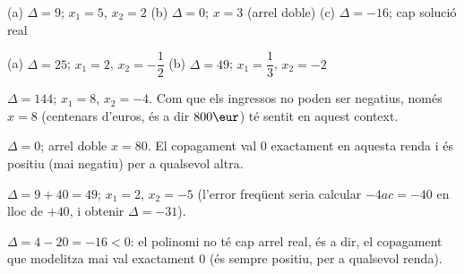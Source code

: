 \begin{solucions}
\begin{sollist}
  \item (a) $\Delta=9$; $x_1=5$, $x_2=2$ \quad
        (b) $\Delta=0$; $x=3$ (arrel doble) \quad
        (c) $\Delta=-16$; cap solució real
  \item (a) $\Delta=25$; $x_1=2$, $x_2=-\dfrac12$ \quad
        (b) $\Delta=49$; $x_1=\dfrac13$, $x_2=-2$
  \item $\Delta=144$; $x_1=8$, $x_2=-4$. Com que els ingressos no poden ser
        negatius, només $x=8$ (centenars d'euros, és a dir $800\eur$) té
        sentit en aquest context.
  \item $\Delta=0$; arrel doble $x=80$. El copagament val $0$ exactament en
        aquesta renda i és positiu (mai negatiu) per a qualsevol altra.
  \item $\Delta=9+40=49$; $x_1=2$, $x_2=-5$ (l'error freqüent seria
        calcular $-4ac=-40$ en lloc de $+40$, i obtenir $\Delta=-31$).
  \item $\Delta=4-20=-16<0$: el polinomi no té cap arrel real, és a dir, el
        copagament que modelitza mai val exactament $0$ (és sempre positiu,
        per a qualsevol renda).
\end{sollist}
\end{solucions}
